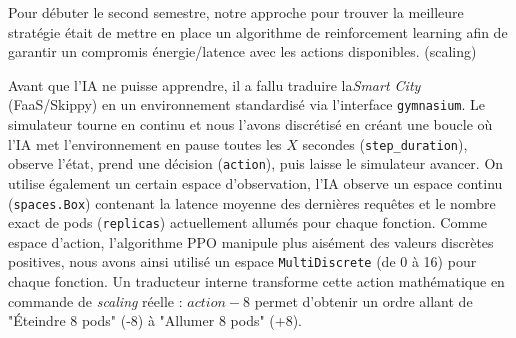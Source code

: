 

Pour débuter le second semestre, notre approche pour trouver la meilleure stratégie était de mettre en place un algorithme de reinforcement learning afin de garantir un compromis énergie/latence avec les actions disponibles. (scaling) 

Avant que l'IA ne puisse apprendre, il a fallu traduire la\textit{Smart City} (FaaS/Skippy) en un environnement standardisé via l'interface \texttt{gymnasium}.
Le simulateur tourne en continu et nous l'avons discrétisé en créant une boucle où l'IA met l'environnement en pause toutes les $X$ secondes (\texttt{step\_duration}), observe l'état, prend une décision (\texttt{action}), puis laisse le simulateur avancer.
On utilise également un certain espace d'observation, l'IA observe un espace continu (\texttt{spaces.Box}) contenant la latence moyenne des dernières requêtes et le nombre exact de pods (\texttt{replicas}) actuellement allumés pour chaque fonction.
Comme espace d'action, l'algorithme PPO manipule plus aisément des valeurs discrètes positives, nous avons ainsi utilisé un espace \texttt{MultiDiscrete} (de 0 à 16) pour chaque fonction. Un traducteur interne transforme cette action mathématique en commande de \textit{scaling} réelle : $action - 8$ permet d'obtenir un ordre allant de "Éteindre 8 pods" (-8) à "Allumer 8 pods" (+8).


